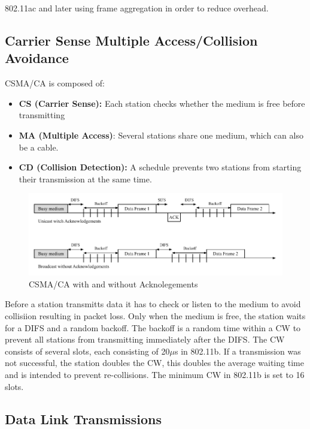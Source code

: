 802.11ac and later using frame aggregation in order to reduce overhead.

\subsection*{Carrier Sense Multiple Access/Collision Avoidance}

\ac{CSMA/CA} is composed of:
\begin{itemize}
	\setlength\itemsep{-0.0em}
	\item \textbf{CS (Carrier Sense):} Each station checks whether the medium is free before transmitting
	\item \textbf{MA (Multiple Access)}: Several stations share one medium, which can also be a cable.
	\item \textbf{CD (Collision Detection):} A schedule prevents two stations from starting their transmission at the same time.
\end{itemize}

\begin{figure}[h]
	\centering
	\includegraphics[scale=0.75]{figures/CSMA_CD.pdf}
	\caption{CSMA/CA with and without Acknolegements}
	\label{fig:CSMACD}
\end{figure}

Before a station transmitts data it has to check or listen to the medium to avoid collisiion resulting in packet loss.
Only when the medium is free, the station waits for a \ac{DIFS} and a random backoff.
The backoff is a random time within a \ac{CW} to prevent all stations from transmitting immediately after the \ac{DIFS}.
The \ac{CW} consists of several slots, each consisting of 20$\mu$s in 802.11b.
If a transmission was not successful, the station doubles the \ac{CW}, 
this doubles the average waiting time and is intended to prevent re-collisions.
The minimum \ac{CW} in 802.11b is set to 16 slots.

\subsection*{Data Link Transmissions}

